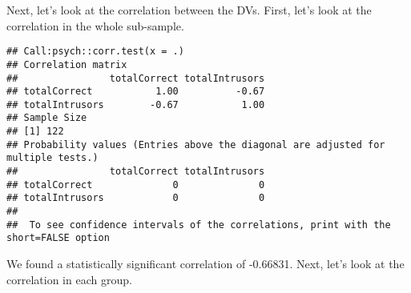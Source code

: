 \documentclass[12pt,]{article}
\newenvironment{Shaded}{\begin{snugshade}}{\end{snugshade}}
\newcommand{\DataTypeTok}[1]{\textcolor[rgb]{0.13,0.29,0.53}{#1}}
\newcommand{\KeywordTok}[1]{\textcolor[rgb]{0.13,0.29,0.53}{\textbf{#1}}}
\newcommand{\NormalTok}[1]{#1}
\newcommand{\OperatorTok}[1]{\textcolor[rgb]{0.81,0.36,0.00}{\textbf{#1}}}
\newcommand{\StringTok}[1]{\textcolor[rgb]{0.31,0.60,0.02}{#1}}
\begin{document}
Next, let's look at the correlation between the DVs. First, let's look
at the correlation in the whole sub-sample.

\begin{Shaded}
\end{Shaded}

\begin{verbatim}
## Call:psych::corr.test(x = .)
## Correlation matrix 
##                totalCorrect totalIntrusors
## totalCorrect           1.00          -0.67
## totalIntrusors        -0.67           1.00
## Sample Size 
## [1] 122
## Probability values (Entries above the diagonal are adjusted for multiple tests.) 
##                totalCorrect totalIntrusors
## totalCorrect              0              0
## totalIntrusors            0              0
## 
##  To see confidence intervals of the correlations, print with the short=FALSE option
\end{verbatim}

We found a statistically significant correlation of -0.66831. Next,
let's look at the correlation in each group.

\begin{Shaded}
\end{Shaded}
\end{document}
